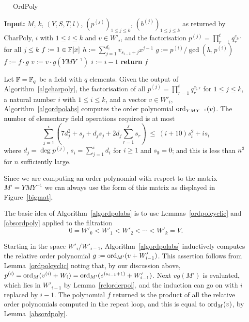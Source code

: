 \begin{algorithm}
\caption{$\quad$ \sc OrdPoly}
\label{algordpolabs}
\begin{algorithmic}
\STATE \textbf{Input:} $M$, $k$, $(Y,S,T,l)$, $(p^{(j)})_{1 \le j \le k}$,
$(b^{(j)})_{1 \le j \le k}$ as returned by {\sc CharPoly},
\STATE \hspace*{0mm} %
$i$ with $1 \le i \le k$ and 
$v \in W'_i$, and the factorisation  
$p^{(j)} = \prod_{r=1}^t q_r^{e_{j,r}}$ for all $j\leq k$
\vspace*{2mm}
\STATE $f := 1 \in \mathbb{F}[x]$
\REPEAT
    \STATE $h := \sum_{j=1}^{d_i} v_{s_{i-1}+j} x^{j-1}$
        \STATE $g := p^{(i)}/\gcd(h,p^{(i)})$
        \STATE $f := f \cdot g$
            \STATE $v := v \cdot g(YMY^{-1})$ \hspace*{1cm} 
        \ENDIF
    \ENDIF
    \STATE $i := i - 1$
\STATE \textbf{return} $f$
\end{algorithmic}
\end{algorithm}

\begin{Prop}
\label{propordpol}
Let $\mathbb{F} = \mathbb{F}_q$ be a field with $q$ elements.
Given the output of Algorithm~\ref{algcharpoly}, 
the factorisation of all $p^{(j)} = \prod_{r=1}^t q_r^{e_{j,r}}$
for $1 \le j \le k$, 
a natural number $i$ 
with $1 \le i \le k$, and a vector $v \in W'_i$, 
Algorithm~\ref{algordpolabs} computes the order
polynomial $\mathrm{ord}_{YMY^{-1}}(v)$. The number of elementary field operations
required is at most
\[ 
\sum_{j=1}^i \left( 7 d_j^2 + s_j + d_j s_j + 2d_j \sum_{r=1}^j s_r \right)
\ \leq\ (i+10)s_i^2 + is_i 
\]
where $d_j=\deg p^{(j)}$, $s_i=\sum_{j=1}^i d_i$ for $i\geq1$ and $s_0=0$;
and this is less than $n^3$ for $n$ sufficiently large.
\end{Prop}
\proofbeg
Since we are computing an order polynomial with respect to the matrix
$M' = YMY^{-1}$ we can always use the form of this matrix as displayed
in Figure~\ref{bigmat}.

The basic idea of Algorithm~\ref{algordpolabs} is to use
Lemmas~\ref{ordpolcyclic} and \ref{absordpoly} applied to the filtration
\[ 0 = W'_0 < W'_1 < W'_2 < \cdots < W'_k = V. \]

Starting in the space $W'_i/W'_{i-1}$, Algorithm~\ref{algordpolabs} inductively
computes the relative order polynomial $g := \mathrm{ord}_{M'}(v+W'_{i-1})$. This assertion follows from
Lemma~\ref{ordpolcyclic} noting that,
by our discussion above, $p^{(i)} = \mathrm{ord}_M(v^{(i)}+W_i)= \mathrm{ord}_{M'}(e^{(s_{i-1}+1)}+W'_{i-1})$.
Next $v g(M')$ is evaluated, which lies in $W'_{i-1}$ by
Lemma~\ref{relorderpol}, and the induction can go on with $i$
replaced by $i-1$. The polynomial $f$ returned is the product of all 
the relative order polynomials computed in the repeat loop, and this is equal to
$\mathrm{ord}_M(v)$, by Lemma~\ref{absordpoly}.

